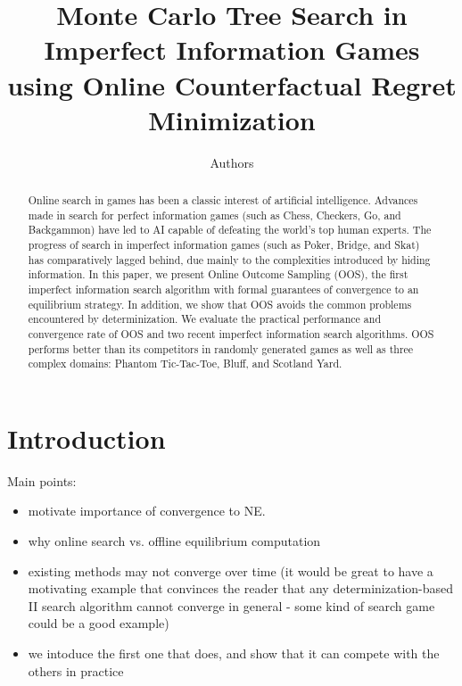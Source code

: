 \documentclass[letterpaper]{article}
\begin{document}
%
\title{Monte Carlo Tree Search in Imperfect Information Games\\using Online Counterfactual Regret Minimization}
\author{Authors}

\newcommand{\vlnote}[1]{{\scriptsize \color{blue} \refstepcounter{vlNoteCounter}\textsf{[VL]$_{\arabic{vlNoteCounter}}$:{#1}}}}

\maketitle

\begin{abstract}
Online search in games has been a classic interest of artificial intelligence.
Advances made in search for perfect information games (such as Chess, Checkers, Go, and Backgammon) have led to AI capable of defeating the world's top human experts. 
The progress of search in imperfect information games (such as Poker, Bridge, and Skat) has comparatively lagged behind, due mainly to the complexities introduced by hiding information. 
In this paper, we present Online Outcome Sampling (OOS), the first imperfect information search algorithm with formal guarantees of convergence to an equilibrium strategy.   
In addition, we show that OOS avoids the common problems encountered by determinization.
We evaluate the practical performance and convergence rate of OOS and two recent imperfect information search algorithms. OOS performs better than its competitors in randomly generated games as well as three complex domains: Phantom Tic-Tac-Toe, Bluff, and Scotland Yard.  
\end{abstract}

\section{Introduction}

Main points: 
\begin{itemize}
\item motivate importance of convergence to NE. 
\item why online search vs. offline equilibrium computation
\item existing methods may not converge over time (it would be great to have a motivating example that convinces the reader that any determinization-based II search algorithm cannot converge in general - some kind of search game could be a good example)
\item we intoduce the first one that does, and show that it can compete with the others in practice
\end{itemize}
\end{document}
